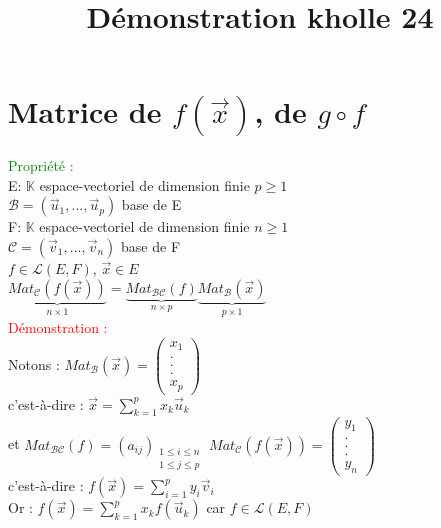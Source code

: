 \documentclass{article}
\begin{document}
\title{Démonstration kholle 24}
\date{}
\maketitle
\renewcommand{\thesection}{\Roman{section}}
	\setlength{\parindent}{1.5cm}
        \section{Matrice de $f(\vec x)$, de $g \circ f $}
        \textcolor{green}{Propriété :} \\
        E: $\mathbb K$ espace-vectoriel de dimension finie $p\geq 1$ \\
        $\mathcal B=(\vec u_1,...,\vec u_p)$ base de E \\
        F: $\mathbb K$ espace-vectoriel de dimension finie $n\geq 1$ \\
        $\mathcal C=(\vec v_1,...,\vec v_n)$ base de F \\
        $f \in \mathcal L (E,F)$, $\vec x \in E$ \\
        $\underbrace{Mat_{\mathcal{C}}(f(\vec x))}_{n\times 1} = \underbrace{Mat_{\mathcal{BC}}(f)}_{n\times p} \underbrace{Mat_{\mathcal B}(\vec x)}_{p \times 1}$ \\
        \textcolor{red}{Démonstration :} \\
        Notons : $Mat_{\mathcal B}(\vec x)= \begin{pmatrix} x_1 \\ . \\ .  \\ . \\ x_p \end{pmatrix}$ \\
        c'est-à-dire : $\vec x = \sum_{k=1}^p x_k \vec u_k$  \\
        et $Mat_{\mathcal{BC}}(f) = (a_{ij}){}_{\substack{1\leq i\leq n \\ 1\leq j\leq p}}$ $Mat_{\mathcal C} (f(\vec x)) =\begin{pmatrix} y_1 \\ . \\ . \\ . \\ y_n \end{pmatrix}$ \\
        c'est-à-dire : $f(\vec x) = \sum_{i=1}^p y_i \vec v_i$ \\
        Or : $f(\vec x)= \sum_{k=1}^p x_k f(\vec u_k)$ car $f \in \mathcal L (E,F)$ \\
\end{document}
